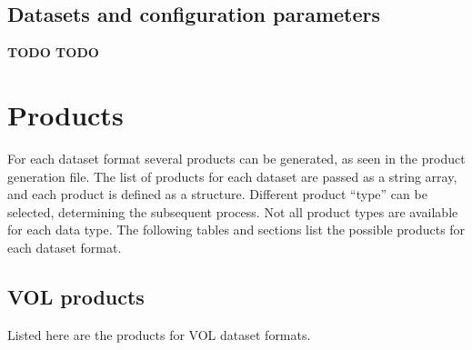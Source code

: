 \documentclass[a4paper,11pt,pdftex,twoside]{scrartcl}
\renewcommand{\bf}{\normalfont \bfseries}
\begin{document}
{{{\begin{longtable}{p{}p{}p{}}
\end{longtable}



\subsection{Datasets and configuration parameters}

{\bf TODO TODO}






\newpage

\section{Products}
\label{sub_products}

For each dataset format several products can be generated, as seen in the product generation file.
The list of products for each dataset are passed as a string array, and each product is defined as a structure.
Different product ``type'' can be selected, determining the subsequent process.
Not all product types are available for each data type. 
The following tables and sections list the possible products for each dataset format.


\subsection{VOL products}
Listed here are the products for VOL dataset formats.

}}}
\end{document}
